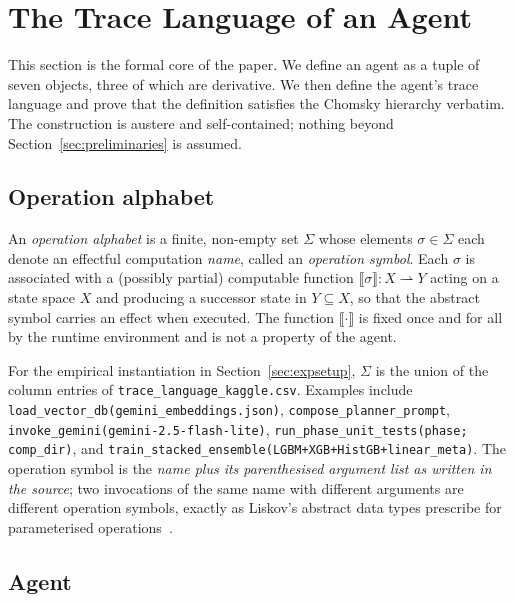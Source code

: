\section{The Trace Language of an Agent}
\label{sec:trace}

This section is the formal core of the paper.  We define an agent
as a tuple of seven objects, three of which are derivative.  We
then define the agent's trace language and prove that the
definition satisfies the Chomsky hierarchy verbatim.  The
construction is austere and self-contained; nothing beyond
Section~\ref{sec:preliminaries} is assumed.

\subsection{Operation alphabet}

\begin{definition}
\label{def:opalpha}
An \emph{operation alphabet} is a finite, non-empty set $\Sigma$
whose elements $\sigma\in\Sigma$ each denote an effectful
computation \emph{name}, called an \emph{operation symbol}.
Each $\sigma$ is associated with a (possibly partial) computable
function $\llbracket\sigma\rrbracket : X \rightharpoonup Y$
acting on a state space $X$ and producing a successor state in
$Y\subseteq X$, so that the abstract symbol carries an effect when
executed.  The function $\llbracket\cdot\rrbracket$ is fixed once
and for all by the runtime environment and is not a property of
the agent.
\end{definition}

\noindent For the empirical instantiation in
Section~\ref{sec:expsetup}, $\Sigma$ is the union of the column
entries of \texttt{trace\_language\_kaggle.csv}.  Examples include
\texttt{load\_vector\_db(gemini\_embeddings.json)},
\texttt{compose\_planner\_prompt},
\texttt{invoke\_gemini(gemini-2.5-flash-lite)},
\texttt{run\_phase\_unit\_tests(phase; comp\_dir)}, and
\texttt{train\_stacked\_ensemble(LGBM+XGB+HistGB+linear\_meta)}.
The operation symbol is the \emph{name plus its parenthesised
argument list as written in the source}; two invocations of the
same name with different arguments are different operation
symbols, exactly as Liskov's abstract data types prescribe for
parameterised operations~\cite{liskov1974abstraction}.

\subsection{Agent}

